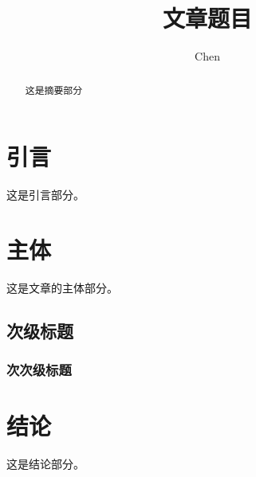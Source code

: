 \documentclass{Article_Template}
\title{文章题目}
\author{Chen}
\date{}
\begin{document}
\maketitle
\tableofcontents
\begin{abstract}
这是摘要部分
\end{abstract}

\section{引言}
这是引言部分。

\section{主体}
这是文章的主体部分。
\subsection{次级标题}
\subsubsection{次次级标题}

\section{结论}
这是结论部分。
\end{document}
